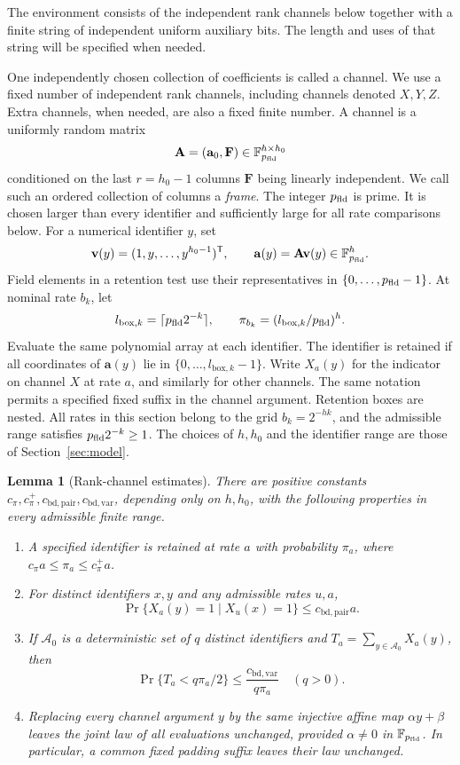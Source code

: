 \documentclass[11pt]{article}
\numberwithin{equation}{section}
\newtheorem{lemma}[theorem]{Lemma}
\theoremstyle{definition}
\theoremstyle{remark}
\begin{document}
The environment consists of the independent rank channels below together
with a finite string of independent uniform auxiliary bits.  The length
and uses of that string will be specified when needed.

One independently chosen collection of coefficients is called a channel. We use a fixed number of independent rank channels, including channels denoted $X,Y,Z$. Extra channels, when needed, are also a fixed finite
number. A channel is a uniformly random matrix
\[
{\mathbf{A}}=({\mathbf{a}}_0,{\mathbf{F}})\in\mathbb F_{p_{\rm fld}}^{{h}\times h_0}
\]
conditioned on the last $r=h_0-1$ columns ${\mathbf{F}}$ being linearly
independent. We call such an ordered collection of columns a \emph{frame}.
The integer ${p_{\rm fld}}$ is prime. It is chosen larger than every
identifier and sufficiently large for all rate comparisons below.
For a numerical identifier $y$, set
\[
{\mathbf{v}}(y)=(1,y,\ldots,y^{h_0-1})^{\mathsf T},
\qquad {\mathbf{a}}(y)={\mathbf{A}}{\mathbf{v}}(y)\in\mathbb F_{p_{\rm fld}}^{h}.
\]
Field elements in a retention test use their representatives in
$\{0,\ldots,{p_{\rm fld}}-1\}$. At nominal rate $b_k$, let
\[
{l_{\mathrm{box},k}}=\lceil {p_{\rm fld}}2^{-k}\rceil,\qquad
\pi_{b_k}=({l_{\mathrm{box},k}}/{p_{\rm fld}})^{h}.
\]
Evaluate the same polynomial array at each identifier. The identifier is retained if all coordinates of ${\mathbf{a}}(y)$ lie in
$\{0,\ldots,{l_{\mathrm{box},k}}-1\}$. Write $X_a(y)$ for the indicator on channel
$X$ at rate $a$, and similarly for other channels.
The same notation permits a specified fixed suffix in the channel
argument. Retention boxes are nested.
All rates in this section belong to the grid $b_k=2^{-{h}k}$, and the
admissible range satisfies ${p_{\rm fld}}2^{-k}\ge1$. The choices of ${h},h_0$ and
the identifier range are those of Section~\ref{sec:model}.

\begin{lemma}[Rank-channel estimates]\label{lem:env-ranks}
There are positive constants $c_\pi,{c_\pi^+},{c_{\mathrm{bd},\mathrm{pair}}},{c_{\mathrm{bd},\mathrm{var}}}$,
depending only on ${h},h_0$, with the following properties in every
admissible finite range.
\begin{enumerate}
\item A specified identifier is retained at rate $a$ with probability
$\pi_a$, where $c_\pi a\le\pi_a\le {c_\pi^+} a$.
\item For distinct identifiers $x,y$ and any admissible rates $u,a$,
\[
\Pr\{X_a(y)=1\mid X_u(x)=1\}\le {c_{\mathrm{bd},\mathrm{pair}}}a.
\]
\item If ${\mathcal{A}}_0$ is a deterministic set of $q$ distinct identifiers and
$T_a=\sum_{y\in {\mathcal{A}}_0}X_a(y)$, then
\[
\Pr\{T_a<q\pi_a/2\}\le \frac{{c_{\mathrm{bd},\mathrm{var}}}}{q\pi_a}
\quad(q>0).
\]
\item Replacing every channel argument $y$ by the same injective affine
map $\alpha y+\beta$ leaves the joint law of all evaluations unchanged,
provided $\alpha\ne0$ in $\mathbb F_{p_{\rm fld}}$. In particular, a common fixed
padding suffix leaves their law unchanged.
\end{enumerate}
\end{lemma}
\end{document}
